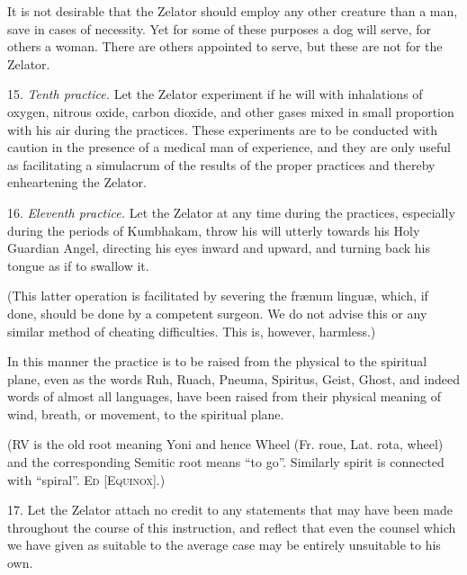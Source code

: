 It is not desirable that the Zelator should employ any other creature than a man, save in cases of necessity. Yet for some of these purposes a dog will serve, for others a woman. There are others appointed to serve, but these are not for the Zelator.

15. \textit{Tenth practice.} \textemdash{} Let the Zelator experiment if he will with inhalations of oxygen, nitrous oxide, carbon dioxide, and other gases mixed in small proportion with his air during the practices. These experiments are to be conducted with caution in the presence of a medical man of experience, and they are only useful as facilitating a simulacrum of the results of the proper practices and thereby enheartening the Zelator.

16. \textit{Eleventh practice.} \textemdash{} Let the Zelator at any time during the practices, especially during the periods of Kumbhakam, throw his will utterly towards his Holy Guardian Angel, directing his eyes inward and upward, and turning back his tongue as if to swallow it.

(This latter operation is facilitated by severing the fr\ae{}num lingu\ae{}, which, if done, should be done by a competent surgeon. We do not advise this or any similar method of cheating difficulties. This is, however, harmless.)

In this manner the practice is to be raised from the physical to the spiritual plane, even as the words Ruh, Ruach, Pneuma, Spiritus, Geist, Ghost, and indeed words of almost all languages, have been raised from their physical meaning of wind, breath, or movement, to the spiritual plane.

(RV is the old root meaning Yoni and hence Wheel (Fr. roue, Lat. rota, wheel) and the corresponding Semitic root means \enquote{to go}. Similarly spirit is connected with \enquote{spiral}. \textemdash{} \textsc{Ed [Equinox]}.)

17. Let the Zelator attach no credit to any statements that may have been made throughout the course of this instruction, and reflect that even the counsel which we have given as suitable to the average case may be entirely unsuitable to his own.
